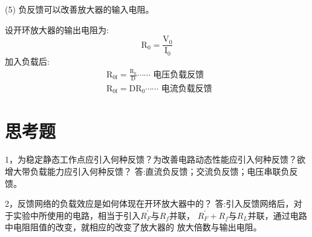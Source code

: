 \documentclass[lang=cn,11pt]{elegantpaper}
\begin{document}
(5) 负反馈可以改善放大器的输入电阻。

设开环放大器的输出电阻为:
$$
\mathrm{R}_{0}=\frac{\mathrm{V}_{0}}{\mathrm{I}_{0}}
$$
加入负载后:
$$
\begin{aligned}
&\mathrm{R}_{0 \mathrm{f}}=\frac{\mathrm{R}_{0}}{\mathrm{D}} \cdots \cdots \text { 电压负载反馈 } \\
&\mathrm{R}_{0 \mathrm{f}}=\mathrm{DR}_{0} \cdots \cdots \text { 电流负载反馈 }
\end{aligned}
$$

\section{思考题}

1，为稳定静态工作点应引入何种反馈？为改善电路动态性能应引入何种反馈？欲增大带负载能力应引入何种反馈？
答:直流负反馈；交流负反馈；电压串联负反馈。


2，反馈网络的负载效应是如何体现在开环放大器中的？
答:引入反馈网络后，对于实验中所使用的电路，相当于引入$R_{F}^{'}$与$R_{f}$并联，
$R_{F}^{'}+R_{f}$与$R_{L}$并联，通过电路中电阻阻值的改变，就相应的改变了放大器的
放大倍数与输出电阻。
\end{document}
